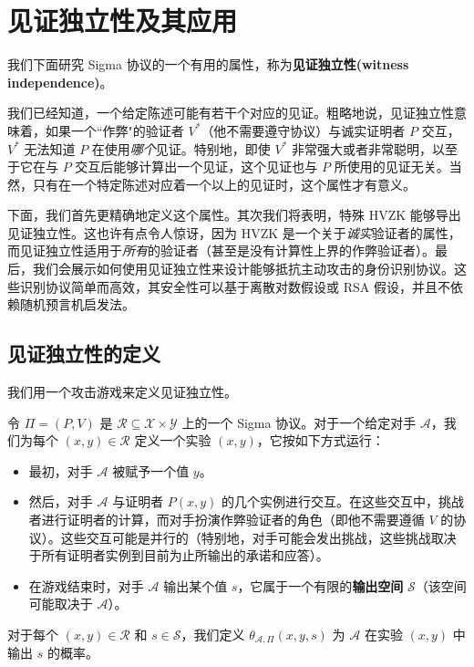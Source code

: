 \section{见证独立性及其应用}

我们下面研究 Sigma 协议的一个有用的属性，称为\textbf{见证独立性(witness independence)}。

我们已经知道，一个给定陈述可能有若干个对应的见证。粗略地说，见证独立性意味着，如果一个``作弊"的验证者 $V^*$（他不需要遵守协议）与诚实证明者 $P$ 交互，$V^*$ 无法知道 $P$ 在使用\emph{哪个}见证。特别地，即使 $V^*$ 非常强大或者非常聪明，以至于它在与 $P$ 交互后能够计算出一个见证，这个见证也与 $P$ 所使用的见证无关。当然，只有在一个特定陈述对应着一个以上的见证时，这个属性才有意义。

下面，我们首先更精确地定义这个属性。其次我们将表明，特殊 HVZK 能够导出见证独立性。这也许有点令人惊讶，因为 HVZK 是一个关于\emph{诚实}验证者的属性，而见证独立性适用于\emph{所有}的验证者（甚至是没有计算性上界的作弊验证者）。最后，我们会展示如何使用见证独立性来设计能够抵抗主动攻击的身份识别协议。这些识别协议简单而高效，其安全性可以基于离散对数假设或 RSA 假设，并且不依赖随机预言机启发法。

\subsection{见证独立性的定义}

我们用一个攻击游戏来定义见证独立性。

\begin{game}[见证独立性]\label{game:19-3}
令 $\Pi=(P,V)$ 是 $\mathcal{R}\subseteq\mathcal{X}×\mathcal{Y}$ 上的一个 Sigma 协议。对于一个给定对手 $\mathcal{A}$，我们为每个 $(x,y)\in\mathcal{R}$ 定义一个实验 $(x,y)$，它按如下方式运行：
\begin{itemize}
	\item 最初，对手 $\mathcal{A}$ 被赋予一个值 $y$。
	\item 然后，对手 $\mathcal{A}$ 与证明者 $P(x,y)$ 的几个实例进行交互。在这些交互中，挑战者进行证明者的计算，而对手扮演作弊验证者的角色（即他不需要遵循 $V$ 的协议）。这些交互可能是并行的（特别地，对手可能会发出挑战，这些挑战取决于所有证明者实例到目前为止所输出的承诺和应答）。
	\item 在游戏结束时，对手 $\mathcal{A}$ 输出某个值 $s$，它属于一个有限的\textbf{输出空间} $\mathcal{S}$（该空间可能取决于 $\mathcal{A}$）。
\end{itemize}
对于每个 $(x,y)\in\mathcal{R}$ 和 $s\in\mathcal{S}$，我们定义 $\theta_{\mathcal{A},\Pi}(x,y,s)$ 为 $\mathcal{A}$ 在实验 $(x,y)$ 中输出 $s$ 的概率。
\end{game}

